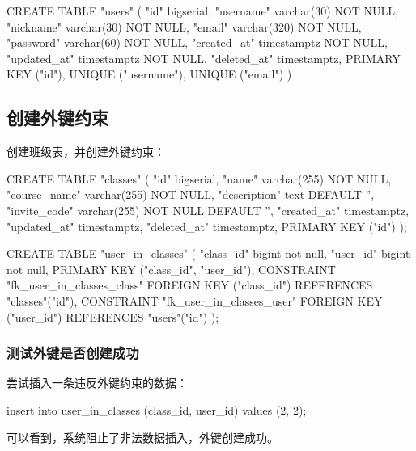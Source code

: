 \documentclass{ctexrep}
\begin{document}
\begin{runsilent}
    CREATE TABLE "users" (
        "id" bigserial,
        "username" varchar(30) NOT NULL,
        "nickname" varchar(30) NOT NULL,
        "email" varchar(320) NOT NULL,
        "password" varchar(60) NOT NULL,
        "created_at" timestamptz NOT NULL,
        "updated_at" timestamptz NOT NULL,
        "deleted_at" timestamptz,
        PRIMARY KEY ("id"),
        UNIQUE ("username"),
        UNIQUE ("email")
    )
\end{runsilent}

\subsection{创建外键约束}
创建班级表，并创建外键约束：
\begin{run}
    CREATE TABLE "classes" (
        "id" bigserial,
        "name" varchar(255) NOT NULL,
        "course_name" varchar(255) NOT NULL,
        "description" text DEFAULT '',
        "invite_code" varchar(255) NOT NULL DEFAULT '',
        "created_at" timestamptz,
        "updated_at" timestamptz,
        "deleted_at" timestamptz,
        PRIMARY KEY ("id")
    );

    CREATE TABLE "user_in_classes" (
        "class_id" bigint not null,
        "user_id" bigint not null,
        PRIMARY KEY ("class_id", "user_id"),
        CONSTRAINT "fk_user_in_classes_class" FOREIGN KEY ("class_id") REFERENCES "classes"("id"),
        CONSTRAINT "fk_user_in_classes_user" FOREIGN KEY ("user_id") REFERENCES "users"("id")
    );
\end{run}
\subsubsection{测试外键是否创建成功}
尝试插入一条违反外键约束的数据：
\begin{run}
    insert into user_in_classes (class_id, user_id) values (2, 2);
\end{run}
可以看到，系统阻止了非法数据插入，外键创建成功。
\end{document}
